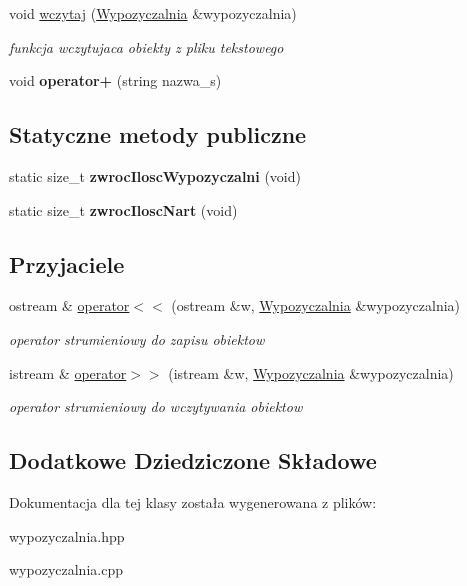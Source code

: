 \begin{DoxyCompactItemize}
void \hyperlink{class_wypozyczalnia_a962569bfd0e3f5c8a88facf5494134ac}{wczytaj} (\hyperlink{class_wypozyczalnia}{Wypozyczalnia} \&wypozyczalnia)
\begin{DoxyCompactList}\small\item\em funkcja wczytujaca obiekty z pliku tekstowego \end{DoxyCompactList}\item 
\mbox{\label{class_wypozyczalnia_a0ca06cb1a024785c467b90f4c0c1ce39}} 
void {\bfseries operator+} (string nazwa\+\_\+s)
\end{DoxyCompactItemize}
\subsection*{Statyczne metody publiczne}
\begin{DoxyCompactItemize}
\item 
\mbox{\label{class_wypozyczalnia_a98cc31471aaf1bedc8c194b8aed569fa}} 
static size\+\_\+t {\bfseries zwroc\+Ilosc\+Wypozyczalni} (void)
\item 
\mbox{\label{class_wypozyczalnia_a032fa06c91b8387bd88a8c8327fa285b}} 
static size\+\_\+t {\bfseries zwroc\+Ilosc\+Nart} (void)
\end{DoxyCompactItemize}
\subsection*{Przyjaciele}
\begin{DoxyCompactItemize}
\item 
\mbox{\label{class_wypozyczalnia_af5ea96fcbdb1c9852a8341e35600390a}} 
ostream \& \hyperlink{class_wypozyczalnia_af5ea96fcbdb1c9852a8341e35600390a}{operator$<$$<$} (ostream \&w, \hyperlink{class_wypozyczalnia}{Wypozyczalnia} \&wypozyczalnia)
\begin{DoxyCompactList}\small\item\em operator strumieniowy do zapisu obiektow \end{DoxyCompactList}\item 
\mbox{\label{class_wypozyczalnia_ad1e5a54a55c89627dbb4ac3558c7edb7}} 
istream \& \hyperlink{class_wypozyczalnia_ad1e5a54a55c89627dbb4ac3558c7edb7}{operator$>$$>$} (istream \&w, \hyperlink{class_wypozyczalnia}{Wypozyczalnia} \&wypozyczalnia)
\begin{DoxyCompactList}\small\item\em operator strumieniowy do wczytywania obiektow \end{DoxyCompactList}\end{DoxyCompactItemize}
\subsection*{Dodatkowe Dziedziczone Składowe}


Dokumentacja dla tej klasy została wygenerowana z plików\+:\begin{DoxyCompactItemize}
\item 
wypozyczalnia.\+hpp\item 
wypozyczalnia.\+cpp\end{DoxyCompactItemize}
